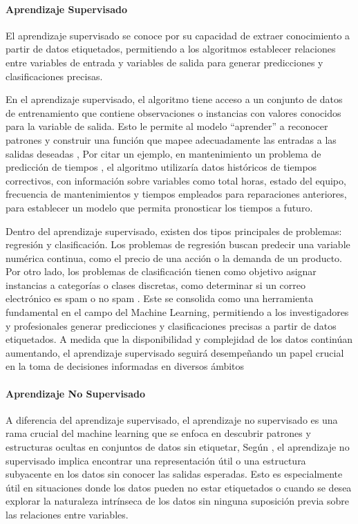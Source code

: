 \documentclass[
  11pt,
  bookmarksnumbered]{article}
\begin{document}
\hypertarget{aprendizaje-supervisado}{%
\paragraph{Aprendizaje Supervisado}\label{aprendizaje-supervisado}}

El aprendizaje supervisado se conoce por su capacidad de extraer conocimiento a partir de datos etiquetados, permitiendo a los algoritmos establecer relaciones entre variables de entrada y variables de salida para generar predicciones y clasificaciones precisas.

En el aprendizaje supervisado, el algoritmo tiene acceso a un conjunto de datos de entrenamiento que contiene observaciones o instancias con valores conocidos para la variable de salida.
Esto le permite al modelo ``aprender'' a reconocer patrones y construir una función que mapee adecuadamente las entradas a las salidas deseadas \textcite{Hastie2009}, Por citar un ejemplo, en mantenimiento un problema de predicción de tiempos , el algoritmo utilizaría datos históricos de tiempos correctivos, con información sobre variables como total horas, estado del equipo, frecuencia de mantenimientos y tiempos empleados para reparaciones anteriores, para establecer un modelo que permita pronosticar los tiempos a futuro.

Dentro del aprendizaje supervisado, existen dos tipos principales de problemas: regresión y clasificación.
Los problemas de regresión buscan predecir una variable numérica continua, como el precio de una acción o la demanda de un producto.
Por otro lado, los problemas de clasificación tienen como objetivo asignar instancias a categorías o clases discretas, como determinar si un correo electrónico es spam o no spam \textcite{Witten2016}.
Este se consolida como una herramienta fundamental en el campo del Machine Learning, permitiendo a los investigadores y profesionales generar predicciones y clasificaciones precisas a partir de datos etiquetados.
A medida que la disponibilidad y complejidad de los datos continúan aumentando, el aprendizaje supervisado seguirá desempeñando un papel crucial en la toma de decisiones informadas en diversos ámbitos

\hypertarget{aprendizaje-no-supervisado}{%
\paragraph{Aprendizaje No Supervisado}\label{aprendizaje-no-supervisado}}

A diferencia del aprendizaje supervisado, el aprendizaje no supervisado es una rama crucial del machine learning que se enfoca en descubrir patrones y estructuras ocultas en conjuntos de datos sin etiquetar, Según \textcite{Bishop2006}, el aprendizaje no supervisado implica encontrar una representación útil o una estructura subyacente en los datos sin conocer las salidas esperadas.
Esto es especialmente útil en situaciones donde los datos pueden no estar etiquetados o cuando se desea explorar la naturaleza intrínseca de los datos sin ninguna suposición previa sobre las relaciones entre variables.
\end{document}
